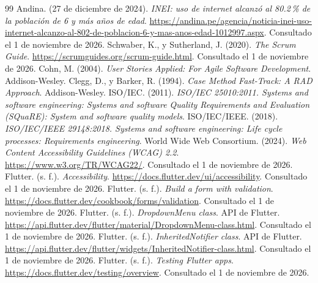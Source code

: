 \begin{thebibliography}{99}
 Andina. (27 de diciembre de 2024). \emph{INEI: uso de internet alcanzó al 80.2\,\% de la población de 6 y más años de edad}. \url{https://andina.pe/agencia/noticia-inei-uso-internet-alcanzo-al-802-de-poblacion-6-y-mas-anos-edad-1012997.aspx}. Consultado el 1 de noviembre de 2026.
 Schwaber, K., y Sutherland, J. (2020). \emph{The Scrum Guide}. \url{https://scrumguides.org/scrum-guide.html}. Consultado el 1 de noviembre de 2026.
 Cohn, M. (2004). \emph{User Stories Applied: For Agile Software Development}. Addison-Wesley.
 Clegg, D., y Barker, R. (1994). \emph{Case Method Fast-Track: A RAD Approach}. Addison-Wesley.
 ISO/IEC. (2011). \emph{ISO/IEC 25010:2011. Systems and software engineering: Systems and software Quality Requirements and Evaluation (SQuaRE): System and software quality models}.
 ISO/IEC/IEEE. (2018). \emph{ISO/IEC/IEEE 29148:2018. Systems and software engineering: Life cycle processes: Requirements engineering}.
 World Wide Web Consortium. (2024). \emph{Web Content Accessibility Guidelines (WCAG) 2.2}. \url{https://www.w3.org/TR/WCAG22/}. Consultado el 1 de noviembre de 2026.
 Flutter. (s. f.). \emph{Accessibility}. \url{https://docs.flutter.dev/ui/accessibility}. Consultado el 1 de noviembre de 2026.
 Flutter. (s. f.). \emph{Build a form with validation}. \url{https://docs.flutter.dev/cookbook/forms/validation}. Consultado el 1 de noviembre de 2026.
 Flutter. (s. f.). \emph{DropdownMenu class}. API de Flutter. \url{https://api.flutter.dev/flutter/material/DropdownMenu-class.html}. Consultado el 1 de noviembre de 2026.
 Flutter. (s. f.). \emph{InheritedNotifier class}. API de Flutter. \url{https://api.flutter.dev/flutter/widgets/InheritedNotifier-class.html}. Consultado el 1 de noviembre de 2026.
 Flutter. (s. f.). \emph{Testing Flutter apps}. \url{https://docs.flutter.dev/testing/overview}. Consultado el 1 de noviembre de 2026.
\end{thebibliography}
